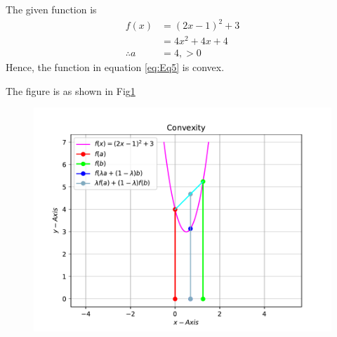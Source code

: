\documentclass[12pt]{article}
\providecommand{\brak}[1]{\ensuremath{\left(#1\right)}}
\begin{document}
\begin{enumerate}
The given function is 
\begin{align}
        \label{eq:Eq5}
	f\brak{x} &= \brak{2x-1}^2 + 3 \\ 
	&= 4x^2+4x+4 \\
	\therefore a &= 4, > 0
\end{align}
Hence, the function in equation \eqref{eq:Eq5} is convex.

The figure is as shown in Fig\ref{fig:Fig1}
\begin{figure}[!h]
	\begin{center}
		\includegraphics[width=\columnwidth]{figs/problem1.pdf}
	\end{center}
\caption{}
\label{fig:Fig1}
\end{figure}
\end{enumerate}
\end{document}
